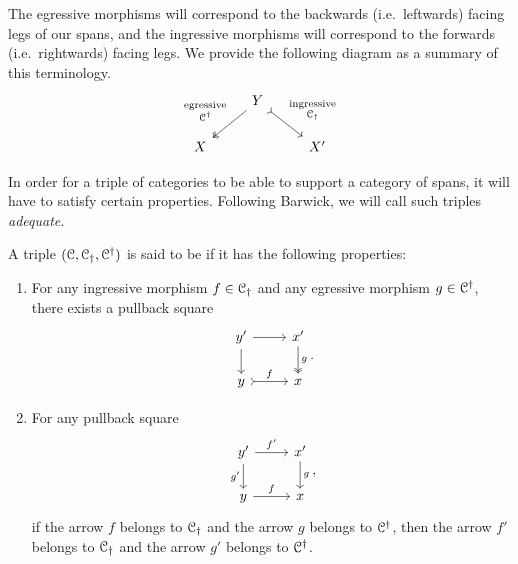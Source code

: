 \documentclass[main.tex]{subfiles}
\begin{document}
The egressive morphisms will correspond to the backwards (i.e.\ leftwards) facing legs of our spans, and the ingressive morphisms will correspond to the forwards (i.e.\ rightwards) facing legs. We provide the following diagram as a summary of this terminology.
\begin{equation*}
  \begin{tikzcd}
    & Y
    \arrow[dl, two heads, swap, "\substack{\text{egressive} \\ \category{C}\updag}"]
    \arrow[dr, rightarrowtail, "\substack{\text{ingressive} \\ \category{C}\downdag}"]
    \\
    X
    && X'
  \end{tikzcd}
\end{equation*}

In order for a triple of categories to be able to support a category of spans, it will have to satisfy certain properties. Following Barwick, we will call such triples \emph{adequate.}

\begin{definition}
  \label{def:adequate_triple}
  A triple $(\mathcal{C}, \mathcal{C}_{\dagger}, \mathcal{C}^{\dagger})$ is said to be  if it has the following properties:
  \begin{enumerate}
    \item For any ingressive morphism $f \in \mathcal{C}_{\dagger}$ and any egressive morphism $g \in \mathcal{C}^{\dagger}$, there exists a pullback square
      \begin{equation*}
        \begin{tikzcd}
          y'
          \arrow[r]
          \arrow[d]
          & x'
          \arrow[d, two heads, "g"]
          \\
          y
          \arrow[r, rightarrowtail, "f"]
          & x
        \end{tikzcd}.
      \end{equation*}

    \item For any pullback square
      \begin{equation*}
        \begin{tikzcd}
          y'
          \arrow[r, "f'"]
          \arrow[d, swap, "g'"]
          & x'
          \arrow[d, "g"]
          \\
          y
          \arrow[r, "f"]
          & x
        \end{tikzcd},
      \end{equation*}
      if the arrow $f$ belongs to $\mathcal{C}_{\dagger}$ and the arrow $g$ belongs to $\mathcal{C}^{\dagger}$, then the arrow $f'$ belongs to $\mathcal{C}_{\dagger}$ and the arrow $g'$ belongs to $\mathcal{C}^{\dagger}$.
  \end{enumerate}
\end{definition}
\end{document}
